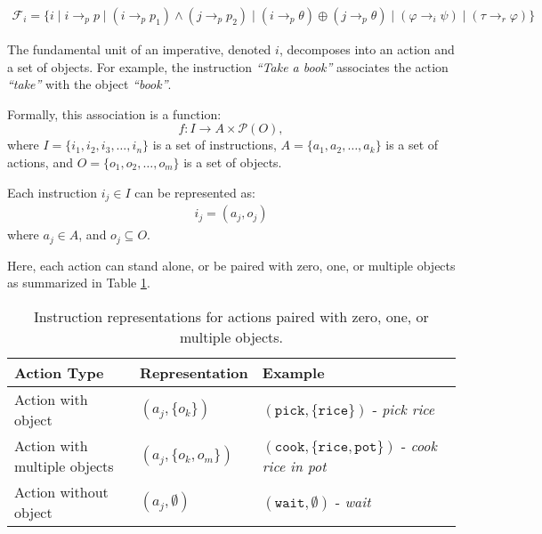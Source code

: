 \documentclass[a4paper,11pt]{lmcs}
\begin{document}
\begin{eqnarray}
\label{eq:formation}
\mathcal{F}_i = \{
i \mid i \rightarrow_p p \mid (i \rightarrow_p p_1) \wedge (j \rightarrow_p p_2) \mid (i \rightarrow_p \theta) \oplus (j \rightarrow_p \theta) \mid (\varphi \rightarrow_i \psi) \mid (\tau \rightarrow_r \varphi)
\}
\end{eqnarray}

The fundamental unit of an imperative, denoted \(i\), decomposes into an action and a set of objects. For example, the instruction \emph{``Take a book''} associates the action \emph{``take''} with the object \emph{``book''}.

Formally, this association is a function:
\[
f : I \to A \times \mathcal{P}(O),
\]
where \(I = \{ i_1, i_2, i_3, \ldots, i_n \}\) is a set of instructions,
\(A = \{ a_1, a_2, \ldots, a_k \}\) is a set of actions, and
\(O = \{ o_1, o_2, \ldots, o_m \}\) is a set of objects.

Each instruction \(i_j \in I\) can be represented as:
\begin{eqnarray}
\label{eq:ac_ob}
i_j = (a_j, o_j)
\end{eqnarray}
where \(a_j \in A\), and \(o_j \subseteq O\).

Here, each action can stand alone, or be paired with zero, one, or multiple objects as summarized in Table \ref{tab:ac_ob}.

\begin{table}[h!]
\label{tab:ac_ob}
\centering
\begin{tabular}{|l|l|l|}
\hline
\textbf{Action Type}           & \textbf{Representation}             & \textbf{Example}                \\
\hline
Action with object             & \((a_j, \{ o_k \})\)                & \((\texttt{pick}, \{\texttt{rice}\})\) - \emph{pick rice} \\
\hline
Action with multiple objects   & \((a_j, \{ o_k, o_m \})\)          & \((\texttt{cook}, \{\texttt{rice}, \texttt{pot}\})\) - \emph{cook rice in pot} \\
\hline
Action without object          & \((a_j, \emptyset)\)                & \((\texttt{wait}, \emptyset)\) - \emph{wait} \\
\hline
\end{tabular}
\caption{Instruction representations for actions paired with zero, one, or multiple objects.}
\end{table}
\end{document}
